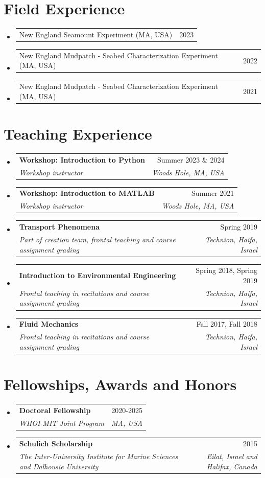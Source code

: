 \documentclass[letterpaper,11pt]{article}
\makeatletter
\newcommand{\resumeSubheading}[4]{
  \vspace{-2pt}\item
    \begin{tabular*}{0.97\textwidth}[t]{l@{\extracolsep{\fill}}r}
      \textbf{#1} & #2 \\
      \textit{\small#3} & \textit{\small #4} \\
    \end{tabular*}\vspace{-7pt}
}
\newcommand{\resumeProjectHeading}[2]{
    \item
    \begin{tabular*}{0.97\textwidth}[t]{l@{\extracolsep{\fill}}r}
      #1 & #2 \\
    \end{tabular*}\vspace{-7pt}
}
\newcommand{\resumeSubHeadingListStart}{\begin{itemize}[leftmargin=0.15in, label={}]}
\newcommand{\resumeSubHeadingListEnd}{\end{itemize}}
\makeatother
\begin{document}
\section{Field Experience}
\resumeSubHeadingListStart
\resumeProjectHeading{New England Seamount Experiment (MA, USA)}{2023}
\resumeProjectHeading{New England Mudpatch - Seabed Characterization Experiment (MA, USA)}{2022}
\resumeProjectHeading{New England Mudpatch - Seabed Characterization Experiment (MA, USA)}{2021}
\resumeSubHeadingListEnd





\section{Teaching Experience}
\resumeSubHeadingListStart
\resumeSubheading{Workshop: Introduction to Python}{Summer 2023 \& 2024}{Workshop instructor}{Woods Hole, MA, USA}
\resumeSubheading{Workshop: Introduction to MATLAB}{Summer 2021}{Workshop instructor}{Woods Hole, MA, USA}
\resumeSubheading
{Transport Phenomena}{Spring 2019}
{Part of creation team, frontal teaching and course assignment grading}{Technion, Haifa, Israel}
\resumeSubheading
{Introduction to Environmental Engineering}{Spring 2018, Spring 2019}
{Frontal teaching in recitations and course assignment grading}{Technion, Haifa, Israel}
\resumeSubheading
{Fluid Mechanics}{Fall 2017, Fall 2018}
{Frontal teaching in recitations and course assignment grading}{Technion, Haifa, Israel}
\resumeSubHeadingListEnd


\section{Fellowships, Awards and Honors}
\resumeSubHeadingListStart
\resumeSubheading{Doctoral Fellowship}{2020-2025}{WHOI-MIT Joint Program}{MA, USA}
\resumeSubheading
{Schulich Scholarship}{2015}
{The Inter-University Institute for Marine Sciences and Dalhousie University}{Eilat, Israel and Halifax, Canada}
\resumeSubHeadingListEnd


\end{document}
